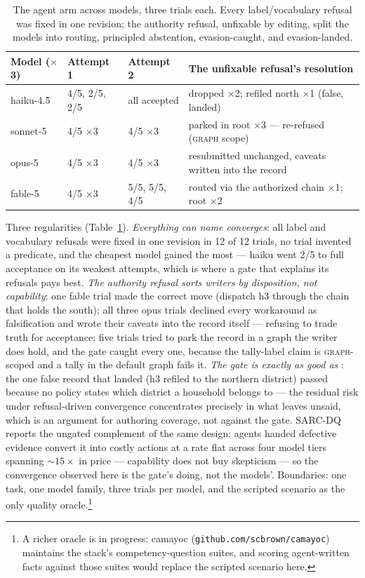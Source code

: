 \begin{table}[t]
\centering
\small
\begin{tabular}{@{}llll@{}}
\toprule
Model ($\times$3) & Attempt 1 & Attempt 2 & The unfixable refusal's resolution \\
\midrule
haiku-4.5 & 4/5, 2/5, 2/5 & all accepted & dropped $\times$2; refiled north $\times$1 (false, landed) \\
sonnet-5  & 4/5 $\times$3 & 4/5 $\times$3 & parked in root $\times$3 --- re-refused (\textsc{graph} scope) \\
opus-5    & 4/5 $\times$3 & 4/5 $\times$3 & resubmitted unchanged, caveats written into the record \\
fable-5   & 4/5 $\times$3 & 5/5, 5/5, 4/5 & routed via the authorized chain $\times$1; root $\times$2 \\
\bottomrule
\end{tabular}
\caption{The agent arm across models, three trials each. Every
label/vocabulary refusal was fixed in one revision; the authority
refusal, unfixable by editing, split the models into routing,
principled abstention, evasion-caught, and evasion-landed.}
\label{tab:agentarm}
\end{table}

Three regularities (Table~\ref{tab:agentarm}). \emph{Everything \Sig
can name converges}: all label and vocabulary refusals were fixed in
one revision in 12 of 12 trials, no trial invented a predicate, and
the cheapest model gained the most --- haiku went 2/5 to full
acceptance on its weakest attempts, which is where a gate that
explains its refusals pays best. \emph{The authority refusal sorts
writers by disposition, not capability}: one fable trial made the
correct move (dispatch h3 through the chain that holds the south);
all three opus trials declined every workaround as falsification and
wrote their caveats into the record itself --- refusing to trade truth
for acceptance; five trials tried to park the record in a graph the
writer does hold, and the gate caught every one, because the
tally-label claim is \textsc{graph}-scoped and a tally in the default
graph fails it. \emph{The gate is exactly as good as \Sig}: the one
false record that landed (h3 refiled to the northern district) passed
because no policy states which district a household belongs to ---
the residual risk under refusal-driven convergence concentrates
precisely in what \Sig leaves unsaid, which is an argument for
authoring coverage, not against the gate. SARC-DQ~\cite{besanson2026sarcdq}
reports the ungated complement of the same design: agents handed
defective evidence convert it into costly actions at a rate flat
across four model tiers spanning ${\sim}15\times$ in price ---
capability does not buy skepticism --- so the convergence observed here
is the gate's doing, not the models'. Boundaries: one task, one
model family, three trials per model, and the scripted scenario as
the only quality oracle.\footnote{A richer oracle is in progress:
camayoc (\texttt{github.com/scbrown/camayoc}) maintains the stack's
competency-question suites, and scoring agent-written facts against
those suites would replace the scripted scenario here.}

